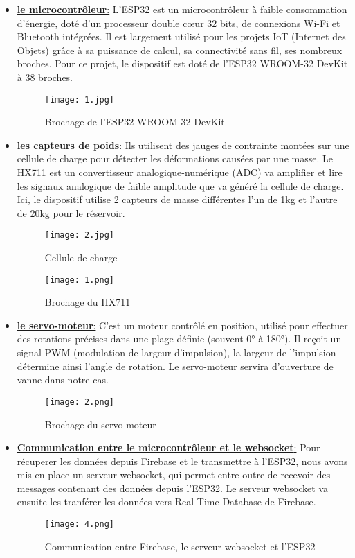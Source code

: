 \begin{itemize}
\item \underline{\textbf{le microcontrôleur}:} L’ESP32 est un microcontrôleur à faible consommation d’énergie, doté d’un processeur double cœur 32 bits, de connexions Wi-Fi et Bluetooth intégrées. Il est largement utilisé pour les projets IoT (Internet des Objets) grâce à sa puissance de calcul, sa connectivité sans fil, ses nombreux broches. Pour ce projet, le dispositif est doté de l'ESP32 WROOM-32 DevKit à 38 broches.\\


\begin{figure}[H]
	\centering
	\texttt{[image: 1.jpg]}
	\caption{Brochage de l'ESP32 WROOM-32 DevKit}
\end{figure}

\item \underline{\textbf{les capteurs de poids}:} Ils utilisent des jauges de contrainte montées sur une cellule de charge pour détecter les déformations causées par une masse. Le HX711 est un convertisseur analogique-numérique (ADC) va amplifier et lire les signaux analogique de faible amplitude que va généré la cellule de charge. Ici, le dispositif utilise 2 capteurs de masse différentes l'un de 1kg et l'autre de 20kg pour le réservoir.

\begin{figure}[H]
	\centering
	\texttt{[image: 2.jpg]}
	\caption{Cellule de charge}
\end{figure}

\begin{figure}[H]
	\centering
	\texttt{[image: 1.png]}
	\caption{Brochage du HX711}
\end{figure}

\item \underline{\textbf{le servo-moteur}:} C'est un moteur contrôlé en position, utilisé pour effectuer des rotations précises dans une plage définie (souvent 0° à 180°). Il reçoit un signal PWM (modulation de largeur d’impulsion), la largeur de l’impulsion détermine ainsi l’angle de rotation. Le servo-moteur servira d'ouverture de vanne dans notre cas.

\begin{figure}[H]
	\centering
	\texttt{[image: 2.png]}
	\caption{Brochage du servo-moteur}
\end{figure}

\item  \underline{\textbf{Communication entre le microcontrôleur et le websocket}:} Pour récuperer les données depuis Firebase et le transmettre à l'ESP32, nous avons mis en place un serveur websocket, qui permet entre outre de recevoir des messages contenant des données depuis l'ESP32.  Le serveur websocket va ensuite les tranférer les données  vers  Real Time Database de Firebase.

\begin{figure}[H]
	\centering
	\texttt{[image: 4.png]}
	\caption{Communication entre Firebase, le serveur websocket et l'ESP32}
\end{figure}

\end{itemize}



